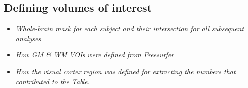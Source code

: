 \subsection{Defining volumes of interest}
\begin{itemize}
\item \textit{Whole-brain mask for each subject and their intersection for all subsequent analyses}
\item \textit{How GM & WM VOIs were defined from Freesurfer}
\item \textit{How the visual cortex region was defined for extracting the numbers that contributed to the Table.}
\end{itemize}






